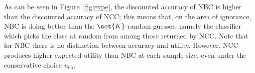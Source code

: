 \documentclass[a4paper,10pt,reqno]{amsart}
\theoremstyle{remark}
\begin{document}


 

As can be seen in Figure~\ref{fig:expe}, the discounted accuracy of NBC is higher than the discounted accuracy of NCC; this means that, on the area of ignorance, NBC is doing better than the $\set{K}$-random guesser, namely the classifier which picks the class at random from among those returned by NCC.
Note that for NBC there is no distinction between accuracy and utility. 
However, NCC produces higher expected utility than NBC at each sample size, even under the conservative choice $u_{65}$.
\end{document}
